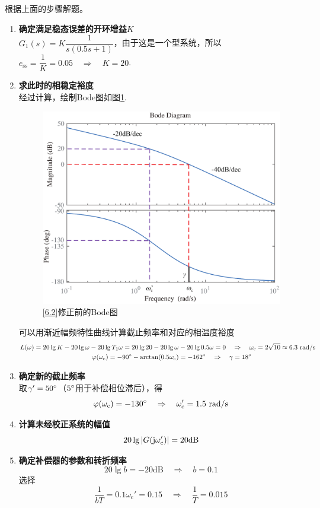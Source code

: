 \solve 根据上面的步骤解题。
\begin{enumerate}
	\item \textbf{确定满足稳态误差的开环增益$K$}\\
	$G_1(s) = K \dfrac{1}{s(0.5s + 1)}$，由于这是一个\RMN[1]型系统，所以$e_{\text{ss}} = \dfrac{1}{K} = 0.05 \quad \Rightarrow \quad K = 20$.
	
	\item \textbf{求此时的相稳定裕度}\\
	经过计算，绘制Bode图如图\ref{F6.2.1}.
	\begin{figure}[!htb]
		\centering
		\includegraphics[width=0.7\linewidth]{pic/6.2.1.pdf}
		\vspace*{-1em}
		\caption{\ref{6.2}修正前的Bode图}
		\label{F6.2.1}
	\end{figure}
	
	可以用渐近幅频特性曲线计算截止频率和对应的相温度裕度
	\begin{align*}
		L(\omega) = 20\lg K - 20\lg \omega - 20 \lg T_1\omega = 20\lg 20 - 20\lg \omega &- 20 \lg 0.5\omega = 0 \quad \Rightarrow \quad \omega_{\text{c}} = 2\sqrt{10} \approx 6.3 \,\,\text{rad/s}\\
		\varphi(\omega_{\text{c}}) = -90{}^{\circ} - \arctan(0.5 \omega_{\text{c}}) &= -162{}^{\circ} \quad \Rightarrow \quad \gamma = 18{}^{\circ}
	\end{align*}
	
	\item \textbf{确定新的截止频率}\\
	取$\gamma' = 50 {}^{\circ}$（$5{}^{\circ}$用于补偿相位滞后），得
	\[
	\varphi(\omega_{\text{c}}) = -130 {}^{\circ} \quad \Rightarrow \quad \omega_{\text{c}}' = 1.5 \,\,\text{rad/s}
	\]
	
	\item \textbf{计算未经校正系统的幅值}
	\[
	20 \lg |G(\text{j} \omega_{\text{c}}')| = 20 \text{dB} 
	\]
	
	\item \textbf{确定补偿器的参数和转折频率}
	\[
	20 \lg b = -20 \text{dB} \quad \Rightarrow \quad b = 0.1 
	\]
	选择
	\[
	\dfrac{1}{bT} = 0.1 \omega_{\text{c}}' = 0.15 \quad \Rightarrow \quad \dfrac{1}{T} = 0.015
	\]
	
\end{enumerate}
